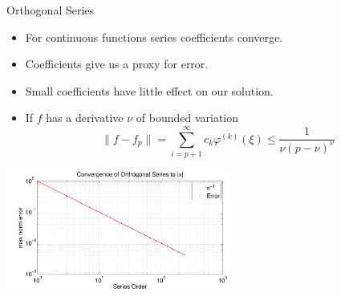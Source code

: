 \documentclass[sansserif]{beamer}
\begin{document}
\begin{frame}{Orthogonal Series}
\begin{itemize}
  \item For continuous functions series coefficients converge.
 \item Coefficients give us a proxy for error.
 \item Small coefficients have little effect on our solution.
  \item If $f$ has a derivative $\nu$ of bounded variation 
 \vspace{0 cm}
 {\scriptsize$$\|f-f_p\|=\sum_{i=p+1}^\infty c_k \varphi^{(k)}(\xi) \le \frac{1}{\nu (p-\nu)^{\nu}}$$}
\end{itemize}
 \vspace{-0.3 cm}
\begin{center}
\includegraphics[height=40mm]{decayrate}
\end{center} 

\end{frame}
\end{document}

